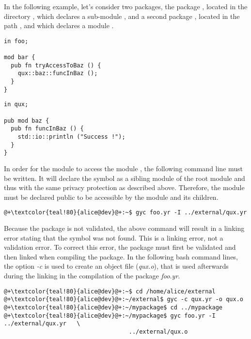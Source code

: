 In the following example, let's consider two packages, the package ,
located in the directory , which declares a
sub-module , and a second package , located in the path
, and which declares a module .

\begin{lstlisting}[caption=\textit{/home/alice/mypackage/foo.yr}, style=coloredverbatim]
in foo;

mod bar {
  pub fn tryAccessToBaz () {
    qux::baz::funcInBaz ();
  }
}
\end{lstlisting}

\begin{lstlisting}[caption=\textit{/home/alice/external/qux.yr}, style=coloredverbatim]
in qux;

pub mod baz {
  pub fn funcInBaz () {
    std::io::println ("Success !");
  }
}
\end{lstlisting}

In order for the module  to access the module
, the following command line must be written. It will declare
the symbol  as a sibling module of the root module  and
thus with the same privacy protection as described above. Therefore, the module
 must be declared public to be accessible by the module
 and its children.

\begin{lstlisting}[style=bashVerb, escapechar=@+]
@+\textcolor{teal!80}{alice@dev}@+:~$ gyc foo.yr -I ../external/qux.yr
\end{lstlisting}

Because the  package is not validated, the above command will result
in a linking error stating that the symbol  was not
found. This is a linking error, not a validation error. To correct this error,
the  package must first be validated and then linked when compiling
the  package. In the following bash command lines, the option
\textit{-c} is used to create an object file (\textit{qux.o}), that is used
afterwards during the linking in the compilation of the package \textit{foo.yr}.

\begin{lstlisting}[style=bashVerb, escapechar=@+]
@+\textcolor{teal!80}{alice@dev}@+:~$ cd /home/alice/external
@+\textcolor{teal!80}{alice@dev}@+:~/external$ gyc -c qux.yr -o qux.o
@+\textcolor{teal!80}{alice@dev}@+:~/mypackage$ cd ../mypackage
@+\textcolor{teal!80}{alice@dev}@+:~/mypackage$ gyc foo.yr -I ../external/qux.yr   \
                                    ../external/qux.o
\end{lstlisting}

